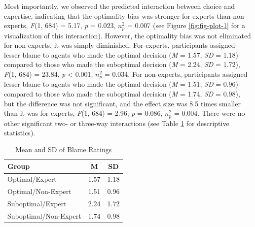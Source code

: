 \documentclass[
  man, donotrepeattitle,floatsintext]{apa6}
\begin{document}
Most importantly, we observed the predicted interaction between choice and expertise, indicating that the optimality bias was stronger for experts than non-experts, \emph{F}(1, 684) = 5.17, \emph{p} = 0.023, \(n^2_p\) = 0.007 (see Figure \ref{fig:fig-plot-1} for a visualization of this interaction). However, the optimality bias was not eliminated for non-experts, it was simply diminished. For experts, participants assigned lesser blame to agents who made the optimal decision (\emph{M} = 1.57, \emph{SD} = 1.18) compared to those who made the suboptimal decision (\emph{M} = 2.24, \emph{SD} = 1.72), \emph{F}(1, 684) = 23.84, \emph{p} \textless{} 0.001, \(n^2_p\) = 0.034. For non-experts, participants assigned lesser blame to agents who made the optimal decision (\emph{M} = 1.51, \emph{SD} = 0.96) compared to those who made the suboptimal decision (\emph{M} = 1.74, \emph{SD} = 0.98), but the difference was not significant, and the effect size was 8.5 times smaller than it was for experts, \emph{F}(1, 684) = 2.96, \emph{p} = 0.086, \(n^2_p\) = 0.004. There were no other significant two- or three-way interactions (see Table \ref{tab:table-table1} for descriptive statistics).

\begin{table}[tbp]

\begin{center}
\begin{threeparttable}

\caption{\label{tab:table-table1}Mean and SD of Blame Ratings}

\begin{tabular}{lll}
\toprule
Group & \multicolumn{1}{c}{M} & \multicolumn{1}{c}{SD}\\
\midrule
Optimal/Expert & 1.57 & 1.18\\
Optimal/Non-Expert & 1.51 & 0.96\\
Suboptimal/Expert & 2.24 & 1.72\\
Suboptimal/Non-Expert & 1.74 & 0.98\\
\bottomrule
\end{tabular}

\end{threeparttable}
\end{center}

\end{table}
\end{document}
